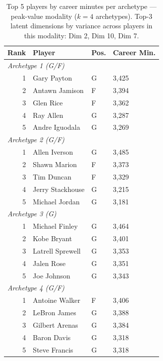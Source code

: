 \begin{table}[htbp]
  \centering\small
  \begin{tabular}{rlll}
    \toprule
    Rank & Player & Pos. & Career Min. \\
    \midrule
    \multicolumn{4}{l}{\textit{Archetype 1 (G/F)}} \\
    \midrule
    1 & Gary Payton & G & 3,425 \\
    2 & Antawn Jamison & F & 3,394 \\
    3 & Glen Rice & F & 3,362 \\
    4 & Ray Allen & G & 3,287 \\
    5 & Andre Iguodala & G & 3,269 \\
    \midrule[0.4pt]
    \multicolumn{4}{l}{\textit{Archetype 2 (G/F)}} \\
    \midrule
    1 & Allen Iverson & G & 3,485 \\
    2 & Shawn Marion & F & 3,373 \\
    3 & Tim Duncan & F & 3,329 \\
    4 & Jerry Stackhouse & G & 3,215 \\
    5 & Michael Jordan & G & 3,181 \\
    \midrule[0.4pt]
    \multicolumn{4}{l}{\textit{Archetype 3 (G)}} \\
    \midrule
    1 & Michael Finley & G & 3,464 \\
    2 & Kobe Bryant & G & 3,401 \\
    3 & Latrell Sprewell & G & 3,353 \\
    4 & Jalen Rose & G & 3,351 \\
    5 & Joe Johnson & G & 3,343 \\
    \midrule[0.4pt]
    \multicolumn{4}{l}{\textit{Archetype 4 (G/F)}} \\
    \midrule
    1 & Antoine Walker & F & 3,406 \\
    2 & LeBron James & G & 3,388 \\
    3 & Gilbert Arenas & G & 3,384 \\
    4 & Baron Davis & G & 3,318 \\
    5 & Steve Francis & G & 3,318 \\
    \bottomrule
  \end{tabular}
  \caption{Top 5 players by career minutes per archetype --- peak-value modality ($k=4$ archetypes). Top-3 latent dimensions by variance across players in this modality: Dim 2, Dim 10, Dim 7.}
  \label{tab:arch_reps_peak_value}
\end{table}

